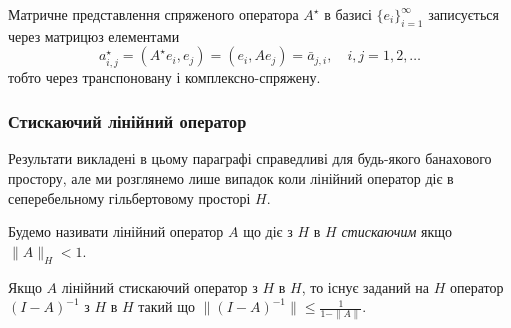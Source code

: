 \begin{proposition}
    Матричне представлення спряженого оператора $A^\star$ в базисі $\{e_i\}_{i = 1}^\infty$ записується через матрицюз елементами
    \begin{equation*}
        a_{i, j}^\star = (A^\star e_i, e_j) = (e_i, A e_j) = \bar a_{j, i}, \quad i, j = 1, 2, \ldots
    \end{equation*}
    тобто через транспоновану і комплексно-спряжену.
\end{proposition}

\subsubsection{Стискаючий лінійний оператор}

Результати викладені в цьому параграфі справедливі для будь-якого банахового простору, але ми розглянемо лише випадок коли лінійний оператор діє в сеперебельному гільбертовому просторі $H$. 

\begin{definition}
    Будемо називати лінійний оператор $A$ що діє з $H$ в $H$ \emph{стискаючим} якщо $\|A\|_H < 1$.
\end{definition}

\begin{lemma}
    Якщо $A$ лінійний стискаючий оператор з $H$ в $H$, то існує заданий на $H$ оператор $(I - A)^{-1}$ з $H$ в $H$ такий що $\|(I - A)^{-1} \| \le \frac{1}{1 - \|A\|}$.
\end{lemma}

